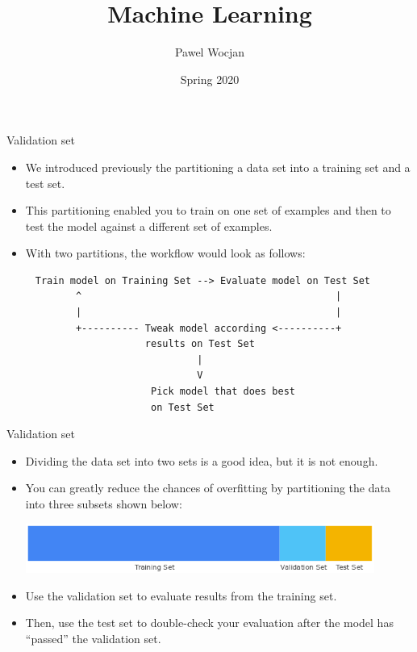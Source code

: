 \documentclass{beamer}
\title[ML]{Machine Learning}
\author{Pawel Wocjan}
\institute{University of Central Florida}
\date{Spring 2020}
\begin{document}
\begin{frame}
  \titlepage
\end{frame}

\begin{frame}[fragile]{Validation set}

\begin{itemize}
\item We introduced previously the partitioning a data set into a training set and a test set. 

\medskip
\item This partitioning enabled you to train on one set of examples and then to test the model against a different set of examples. 

\medskip
\item With two partitions, the workflow would look as follows:
\end{itemize}

{\footnotesize
\begin{verbatim}
     Train model on Training Set --> Evaluate model on Test Set
            ^                                            |
            |                                            |
            +---------- Tweak model according <----------+
                        results on Test Set
                                 |
                                 V
                         Pick model that does best
                         on Test Set
\end{verbatim}
}
\end{frame}


\begin{frame}{Validation set}
\begin{itemize}
\item Dividing the data set into two sets is a good idea, but it is not enough. 

\medskip
\item You can greatly reduce the chances of overfitting by partitioning the data into three subsets shown below:

\medskip
\includegraphics[width=0.9\textwidth]{images/PartitionThreeSets.png}

\medskip
\item Use the validation set to evaluate results from the training set. 

\medskip
\item Then, use the test set to double-check your evaluation after the model has ``passed'' the validation set.
\end{itemize}
\end{frame}
\end{document}
